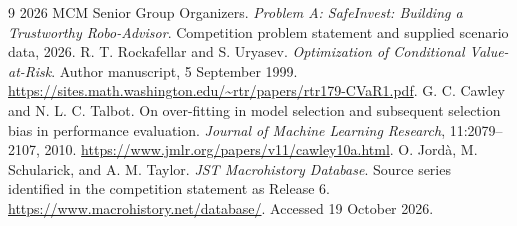 \begin{thebibliography}{9}
 2026 MCM Senior Group Organizers. \emph{Problem A: SafeInvest: Building a Trustworthy Robo-Advisor}. Competition problem statement and supplied scenario data, 2026.
 R. T. Rockafellar and S. Uryasev. \emph{Optimization of Conditional Value-at-Risk}. Author manuscript, 5 September 1999. \url{https://sites.math.washington.edu/~rtr/papers/rtr179-CVaR1.pdf}.
 G. C. Cawley and N. L. C. Talbot. On over-fitting in model selection and subsequent selection bias in performance evaluation. \emph{Journal of Machine Learning Research}, 11:2079--2107, 2010. \url{https://www.jmlr.org/papers/v11/cawley10a.html}.
 O. Jord\`a, M. Schularick, and A. M. Taylor. \emph{JST Macrohistory Database}. Source series identified in the competition statement as Release 6. \url{https://www.macrohistory.net/database/}. Accessed 19 October 2026.
\end{thebibliography}
